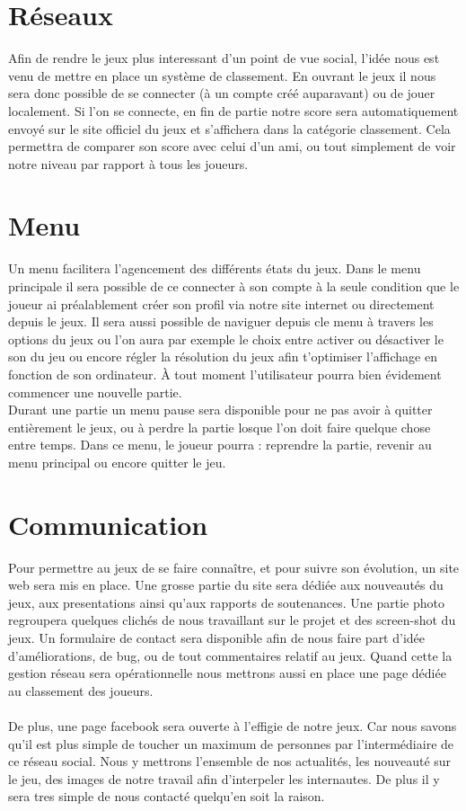 \documentclass [11pt]{report}
\begin{document}
	\section {Réseaux}
	Afin de rendre le jeux plus interessant d'un point de vue social, l'idée nous est venu de mettre en place un système de classement. En ouvrant le jeux il nous sera donc possible de se connecter (à un compte créé auparavant) ou de jouer localement. Si l'on se connecte, en fin de partie notre score sera automatiquement envoyé sur le site officiel du jeux et s'affichera dans la catégorie classement. Cela permettra de comparer son score avec celui d'un ami, ou tout simplement de voir notre niveau par rapport à tous les joueurs.\\\vspace{5mm}


	\section {Menu}
	Un menu facilitera l'agencement des différents états du jeux. Dans le menu principale il sera possible de ce connecter à son compte à la seule condition que le joueur ai préalablement créer son profil via notre site internet ou directement depuis le jeux. Il sera aussi possible de naviguer depuis cle menu à travers les options du jeux ou l'on aura par exemple le choix entre activer ou désactiver le son du jeu ou encore régler la résolution du jeux afin t'optimiser l'affichage en fonction de son ordinateur. \`A tout moment l'utilisateur pourra bien évidement commencer une nouvelle partie. \\
\indent Durant une partie un menu pause sera disponible pour ne pas avoir à quitter entièrement le jeux, ou à perdre la partie losque l'on doit faire quelque chose entre temps. Dans ce menu, le joueur pourra : reprendre la partie, revenir au menu principal ou encore quitter le jeu.\\\vspace{5mm}


	\section {Communication}
	Pour permettre au jeux de se faire conna\^itre, et pour suivre son \'evolution, un site web sera mis en place. Une grosse partie du site sera dédiée aux nouveautés du jeux, aux presentations ainsi qu'aux rapports de soutenances. Une partie photo regroupera quelques clichés de nous travaillant sur le projet et des screen-shot du jeux. Un formulaire de contact sera disponible afin de nous faire part d'idée d'am\'eliorations, de bug, ou de tout commentaires relatif au jeux. Quand cette la gestion réseau sera opérationnelle nous mettrons aussi en place une page dédiée au classement des joueurs.
\\\\ \indent
	De plus, une page facebook sera ouverte à l'effigie de notre jeux. Car nous savons qu'il est plus simple de toucher un maximum de personnes par l'intermédiaire de ce réseau social. Nous y mettrons l'ensemble de nos actualités, les nouveauté sur le jeu, des images de notre travail afin d'interpeler les internautes. De plus il y sera tres simple de nous contacté quelqu'en soit la raison.
\end{document}
